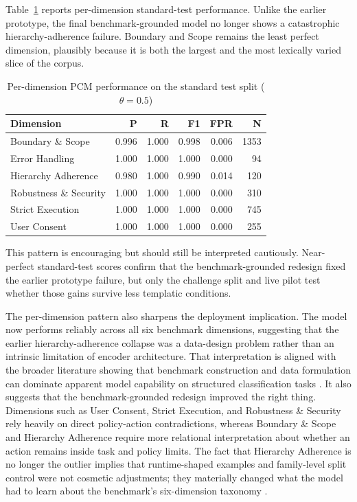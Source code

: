 \documentclass[12pt,a4paper]{article}
\begin{document}
Table~\ref{tab:per_dim_final} reports per-dimension standard-test performance.
Unlike the earlier prototype, the final benchmark-grounded model no longer shows
a catastrophic hierarchy-adherence failure. Boundary and Scope remains the least
perfect dimension, plausibly because it is both the largest and the most
lexically varied slice of the corpus.
 
\begin{table}[h]
\centering\small
\caption{Per-dimension PCM performance on the standard test split ($\theta = 0.5$)}
\label{tab:per_dim_final}
\begin{tabular}{@{} l r r r r r @{}}
\toprule
\textbf{Dimension} & \textbf{P} & \textbf{R} &
\textbf{F1} & \textbf{FPR} & \textbf{N} \\
\midrule
Boundary \& Scope       & 0.996 & 1.000 & 0.998 & 0.006 & 1353 \\
Error Handling          & 1.000 & 1.000 & 1.000 & 0.000 & 94 \\
Hierarchy Adherence     & 0.980 & 1.000 & 0.990 & 0.014 & 120 \\
Robustness \& Security  & 1.000 & 1.000 & 1.000 & 0.000 & 310 \\
Strict Execution        & 1.000 & 1.000 & 1.000 & 0.000 & 745 \\
User Consent            & 1.000 & 1.000 & 1.000 & 0.000 & 255 \\
\bottomrule
\end{tabular}
\end{table}
 
This pattern is encouraging but should still be interpreted cautiously. Near-
perfect standard-test scores confirm that the benchmark-grounded redesign fixed
the earlier prototype failure, but only the challenge split and live pilot test
whether those gains survive less templatic conditions.

The per-dimension pattern also sharpens the deployment implication. The model
now performs reliably across all six benchmark dimensions, suggesting that the
earlier hierarchy-adherence collapse was a data-design problem rather than an
intrinsic limitation of encoder architecture. That interpretation is aligned
with the broader literature showing that benchmark construction and data
formulation can dominate apparent model capability on structured classification
tasks \citep{li2023synthetic,geirhos2020shortcut}. It also suggests that the
benchmark-grounded redesign improved the right thing. Dimensions such as User
Consent, Strict Execution, and Robustness \& Security rely heavily on direct
policy-action contradictions, whereas Boundary \& Scope and Hierarchy Adherence
require more relational interpretation about whether an action remains inside
task and policy limits. The fact that Hierarchy Adherence is no longer the
outlier implies that runtime-shaped examples and family-level split control were
not cosmetic adjustments; they materially changed what the model had to learn
about the benchmark's six-dimension taxonomy \citep{levy2026stwebagentbench}.
\end{document}

